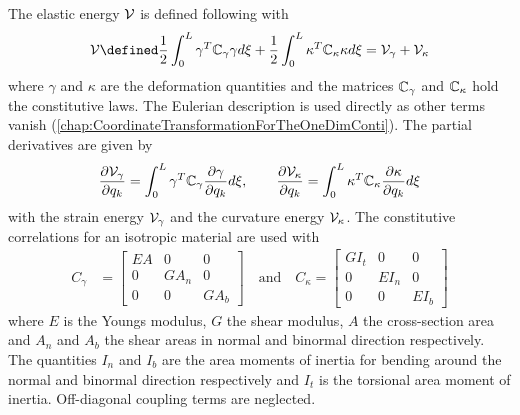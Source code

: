 The elastic energy ${\cal{V}}$ is defined following \cite{jelenic_kinematically_1995} with
%
\begin{align}
  \calV \defined \frac{1}{2} \int _0 ^{L} \gamma^T \msC _{\gamma} \gamma d \xi + \frac{1}{2} \int _0 ^{L} \kappa^T \msC _{\kappa} \kappa d \xi = \calV _{\gamma} + \calV _{\kappa}
\end{align}
%
where $\gamma$ and $\kappa$ are the deformation quantities and the matrices $\mathbb{C} _{\gamma}$ and $\mathbb{C} _{\kappa}$ hold the constitutive laws.
The Eulerian description is used directly as other terms vanish (\cref{chap:CoordinateTransformationForTheOneDimConti}).
The partial derivatives are given by
%
\begin{align}
  \frac{\partial {\ensuremath{{\cal{V}}}_{\gamma}}}{\partial {q_k}} = \int _{0} ^{L} \gamma^T \mathbb{C} _{\gamma} \frac{\partial {\gamma}}{\partial {q_k}} d \xi, \qquad
  \frac{\partial {\ensuremath{{\cal{V}}}_{\kappa}}}{\partial {q_k}} = \int _{0} ^{L} \kappa^T \mathbb{C} _{\kappa} \frac{\partial {\kappa}}{\partial {q_k}} d \xi
\end{align}
%
with the strain energy ${\cal{V}} _{\gamma}$ and the curvature energy ${\cal{V}} _{\kappa}$.
The constitutive correlations for an isotropic material are used with
%
\begin{align}
  C _{\gamma} &=
  \begin{bmatrix}
    EA & 0 & 0 \\
    0 & GA _{n} & 0 \\
    0 & 0 & GA _{b}
  \end{bmatrix} \quad \text{and} \quad
  C _{\kappa} =
  \begin{bmatrix}
    GI_{t} & 0 & 0 \\
    0 & EI _{n} & 0 \\
    0 & 0 & EI _{b}
  \end{bmatrix}
\end{align}
%
where $E$ is the Youngs modulus, $G$ the shear modulus, $A$ the cross-section area and $A _{n}$ and $A _{b}$ the shear areas in normal and binormal direction respectively.
The quantities $I _{n}$ and $I _{b}$ are the area moments of inertia for bending around the normal and binormal direction respectively and $I _{t}$ is the torsional area moment of inertia.
Off-diagonal coupling terms are neglected.
%
